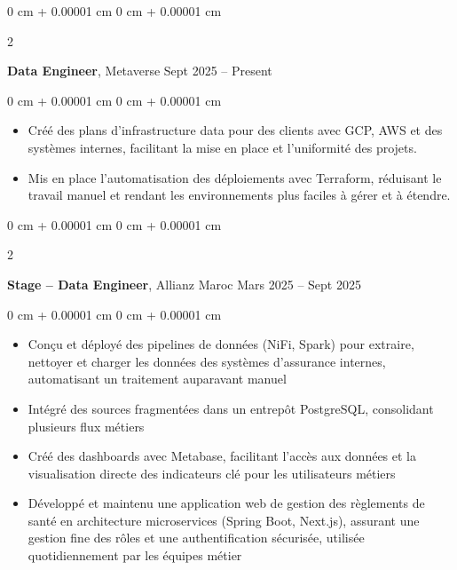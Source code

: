 \documentclass[10pt, letterpaper]{article}
\newenvironment{highlights}{
    \begin{itemize}[
        topsep=0.10 cm,
        parsep=0.10 cm,
        partopsep=0pt,
        itemsep=0pt,
        leftmargin=0 cm + 10pt
    ]
}{
    \end{itemize}
} %
\newenvironment{onecolentry}{
    \begin{adjustwidth}{
        0 cm + 0.00001 cm
    }{
        0 cm + 0.00001 cm
    }
}{
    \end{adjustwidth}
} %
\newenvironment{twocolentry}[2][]{
    \onecolentry
    \def\secondColumn{#2}
    \setcolumnwidth{\fill, 4.5 cm}
    \begin{paracol}{2}
}{
    \switchcolumn \raggedleft \secondColumn
    \end{paracol}
    \endonecolentry
} %
\begin{document}
    \begin{twocolentry}{
            Sept 2025 –  Present
        }
            \textbf{Data Engineer}, Metaverse \end{twocolentry}

        \vspace{0.10 cm}
        \begin{onecolentry}
            \begin{highlights}
                \item Créé des plans d’infrastructure data pour des clients avec GCP, AWS et des systèmes internes, facilitant la mise en place et l’uniformité des projets.  
                \item Mis en place l’automatisation des déploiements avec Terraform, réduisant le travail manuel et rendant les environnements plus faciles à gérer et à étendre.  

            \end{highlights}
        \end{onecolentry}


        \vspace{0.2 cm}
        
        \begin{twocolentry}{
            Mars 2025 – Sept 2025
        }
            \textbf{Stage – Data Engineer}, Allianz Maroc \end{twocolentry}

        \vspace{0.10 cm}
        \begin{onecolentry}
            \begin{highlights}
                \item Conçu et déployé des pipelines de données (NiFi, Spark) pour extraire, nettoyer et charger les données des systèmes d’assurance internes, automatisant un traitement auparavant manuel
                \item Intégré des sources fragmentées dans un entrepôt PostgreSQL, consolidant plusieurs flux métiers
                \item Créé des dashboards avec Metabase, facilitant l’accès aux données et la visualisation directe des indicateurs clé pour les utilisateurs métiers
                \item Développé et maintenu une application web de gestion des règlements de santé en architecture microservices (Spring Boot, Next.js), assurant une gestion fine des rôles et une authentification sécurisée, utilisée quotidiennement par les équipes métier

            \end{highlights}
        \end{onecolentry}
\end{document}
